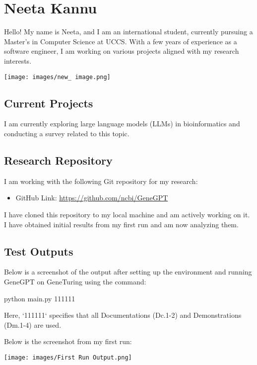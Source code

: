 \section*{Neeta Kannu}
Hello! My name is Neeta, and I am an international student, currently pursuing a Master's in Computer Science at UCCS. With a few years of experience as a software engineer, I am working on various projects aligned with my research interests.

\begin{center}
    \texttt{[image: images/new\_ image.png]}
\end{center}

\subsection*{Current Projects}
I am currently exploring large language models (LLMs) in bioinformatics and conducting a survey related to this topic.

\subsection*{Research Repository}
I am working with the following Git repository for my research:

\begin{itemize}
    \item GitHub Link: \url{https://github.com/ncbi/GeneGPT}
\end{itemize}

I have cloned this repository to my local machine and am actively working on it. 
I have obtained initial results from my first run and am now analyzing them.

\subsection*{Test Outputs}
Below is a screenshot of the output after setting up the environment and running GeneGPT on GeneTuring using the command:

python main.py 111111

Here, `111111` specifies that all Documentations (Dc.1-2) and Demonstrations (Dm.1-4) are used.

Below is the screenshot from my first run:

\begin{center}
    \texttt{[image: images/First Run Output.png]}
\end{center}


